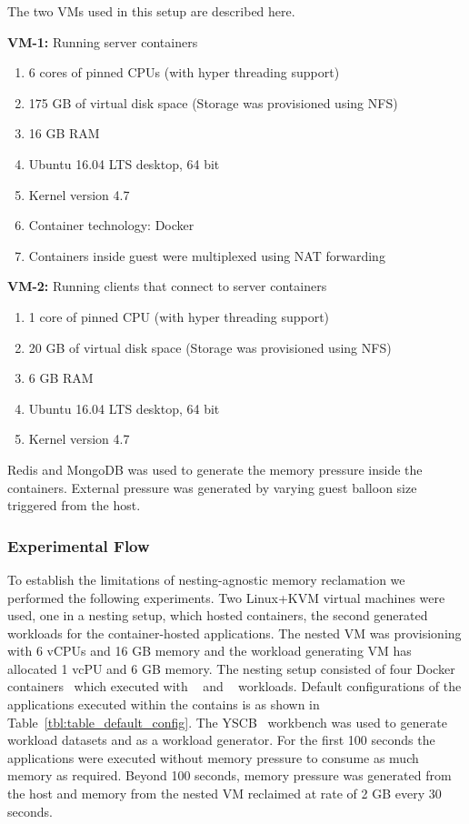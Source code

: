 	The two VMs used in this setup are described here.
	
	\noindent \textbf{VM-1:} Running server containers
	\begin{enumerate}
	  \item 6 cores of pinned CPUs (with hyper threading support)
	  \item 175 GB of virtual disk space (Storage was provisioned using NFS)
	  \item 16 GB RAM
	  \item Ubuntu 16.04 LTS desktop, 64 bit
	  \item Kernel version 4.7
	  \item Container technology: Docker
	  \item Containers inside guest were multiplexed using NAT forwarding
	\end{enumerate}
	
	\noindent \textbf{VM-2:} Running clients that connect to server containers
	\begin{enumerate}
	  \item 1 core of pinned CPU (with hyper threading support)
	  \item 20 GB of virtual disk space (Storage was provisioned using NFS)
	  \item 6 GB RAM
	  \item Ubuntu 16.04 LTS desktop, 64 bit
	  \item Kernel version 4.7
	\end{enumerate}
	
	Redis and MongoDB was used to generate the memory pressure inside the containers. External pressure was generated by varying guest 
balloon size triggered from the host.

      
    \subsubsection{Experimental Flow}
      
      To establish the limitations of nesting-agnostic memory reclamation we performed
      the following experiments. Two Linux+KVM virtual machines were used, one in a nesting setup,
      which hosted containers, the second generated workloads for the 
      container-hosted applications. The nested VM was provisioning with 6 vCPUs
      and 16 GB memory and the workload generating VM has allocated 1 vcPU and 6 GB memory.
      The nesting setup consisted of four Docker containers~\cite{docker}
      which executed with \redis{}~\cite{redis} and
      \mongo{}~\cite{Mongodb} workloads. 
      Default configurations of the applications executed within
      the contains is as shown in Table~\ref{tbl:table_default_config}.
      The YSCB~\cite{cooper2010benchmarking} workbench was used to generate workload datasets and 
      as a workload generator. For the first 100 seconds the applications were executed without 
      memory pressure to consume as much memory as required. Beyond 100 seconds, memory pressure
      was generated from the host and memory from the nested VM reclaimed at rate of 2 GB
      every 30 seconds.

